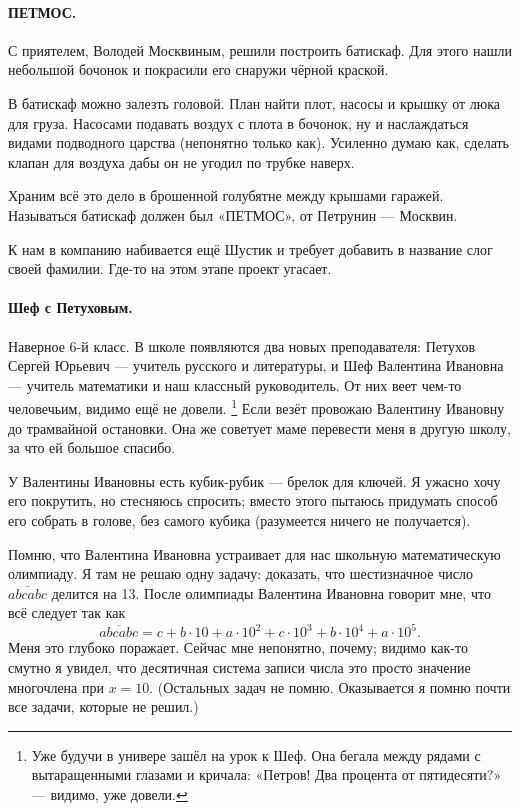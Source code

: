 \documentclass{book}
\begin{document}
\paragraph{ПЕТМОС.}
С приятелем, Володей Москвиным, решили построить батискаф.
Для этого нашли небольшой бочонок и покрасили его снаружи чёрной краской.

В батискаф можно залезть головой.
План найти плот, насосы и крышку от люка для груза.
Насосами подавать воздух с плота в бочонок, ну и наслаждаться видами подводного царства (непонятно только как).
Усиленно думаю как, сделать клапан для воздуха дабы он не угодил по трубке наверх.

Храним всё это дело в брошенной голубятне между крышами гаражей.
Называться батискаф должен был «ПЕТМОС», от Петрунин --- Москвин.

К нам в компанию набивается ещё Шустик и требует добавить в название слог своей фамилии.
Где-то на этом этапе проект угасает.

\paragraph{Шеф с Петуховым.}
Наверное 6-й класс.
В школе появляются два новых преподавателя: Петухов Сергей Юрьевич --- учитель русского и литературы, 
и Шеф Валентина Ивановна --- учитель математики и наш классный руководитель.
От них веет чем-то человечьим, видимо ещё не довели.%
\footnote{Уже будучи в универе зашёл на урок к Шеф.
Она бегала между рядами с вытаращенными глазами 
и кричала: «Петров! Два процента от пятидесяти?» 
--- видимо, уже довели.}
Если везёт провожаю Валентину Ивановну до трамвайной остановки.
Она же советует маме перевести меня в другую школу, за что ей большое спасибо.

У Валентины Ивановны есть кубик-рубик --- брелок для ключей.
Я ужасно хочу его покрутить, но стесняюсь спросить;
вместо этого пытаюсь придумать способ его собрать в голове, без самого кубика (разумеется ничего не получается).

{\sloppy 
Помню, что Валентина Ивановна устраивает для нас школьную математическую олимпиаду.
Я там не решаю одну задачу: доказать, что шестизначное число $\overline{abcabc}$ делится на 13.
После олимпиады Валентина Ивановна говорит мне, что всё следует
так как 
$$\overline{abcabc}
=
c+b\cdot 10+ a\cdot 10^2+
c\cdot 10^3+b\cdot 10^4+ a\cdot 10^5.$$
Меня это глубоко поражает. 
Сейчас мне непонятно, почему;
видимо как-то смутно я увидел, 
что десятичная система записи числа 
это просто значение многочлена при $x=10$.
(Остальных задач не помню.
Оказывается я помню почти все задачи, которые не решил.)

}
\end{document}
